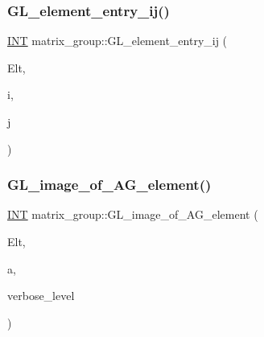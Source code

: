 \mbox{\label{classmatrix__group_ac3536b192d8ac3a833aec329c84dc25f}} 
\subsubsection{\texorpdfstring{G\+L\+\_\+element\+\_\+entry\+\_\+ij()}{GL\_element\_entry\_ij()}}
{\footnotesize\ttfamily \mbox{\hyperlink{galois_8h_a09fddde158a3a20bd2dcadb609de11dc}{I\+NT}} matrix\+\_\+group\+::\+G\+L\+\_\+element\+\_\+entry\+\_\+ij (\begin{DoxyParamCaption}\item[{\mbox{\hyperlink{galois_8h_a09fddde158a3a20bd2dcadb609de11dc}{I\+NT}} $\ast$}]{Elt,  }\item[{\mbox{\hyperlink{galois_8h_a09fddde158a3a20bd2dcadb609de11dc}{I\+NT}}}]{i,  }\item[{\mbox{\hyperlink{galois_8h_a09fddde158a3a20bd2dcadb609de11dc}{I\+NT}}}]{j }\end{DoxyParamCaption})}

\mbox{\label{classmatrix__group_aaf63feeb8e825cf652c60964b6d52498}} 
\subsubsection{\texorpdfstring{G\+L\+\_\+image\+\_\+of\+\_\+\+A\+G\+\_\+element()}{GL\_image\_of\_AG\_element()}}
{\footnotesize\ttfamily \mbox{\hyperlink{galois_8h_a09fddde158a3a20bd2dcadb609de11dc}{I\+NT}} matrix\+\_\+group\+::\+G\+L\+\_\+image\+\_\+of\+\_\+\+A\+G\+\_\+element (\begin{DoxyParamCaption}\item[{\mbox{\hyperlink{galois_8h_a09fddde158a3a20bd2dcadb609de11dc}{I\+NT}} $\ast$}]{Elt,  }\item[{\mbox{\hyperlink{galois_8h_a09fddde158a3a20bd2dcadb609de11dc}{I\+NT}}}]{a,  }\item[{\mbox{\hyperlink{galois_8h_a09fddde158a3a20bd2dcadb609de11dc}{I\+NT}}}]{verbose\+\_\+level }\end{DoxyParamCaption})}


